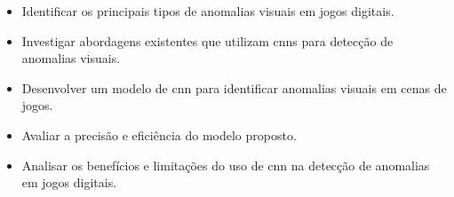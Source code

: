 \begin{itemize}
    \item Identificar os principais tipos de anomalias visuais em jogos digitais.
    \item Investigar abordagens existentes que utilizam \glspl{cnn} para detecção de anomalias visuais.
    \item Desenvolver um modelo de \gls{cnn} para identificar anomalias visuais em cenas de jogos.
    \item Avaliar a precisão e eficiência do modelo proposto.
    \item Analisar os benefícios e limitações do uso de \gls{cnn} na detecção de anomalias em jogos digitais.
\end{itemize} 